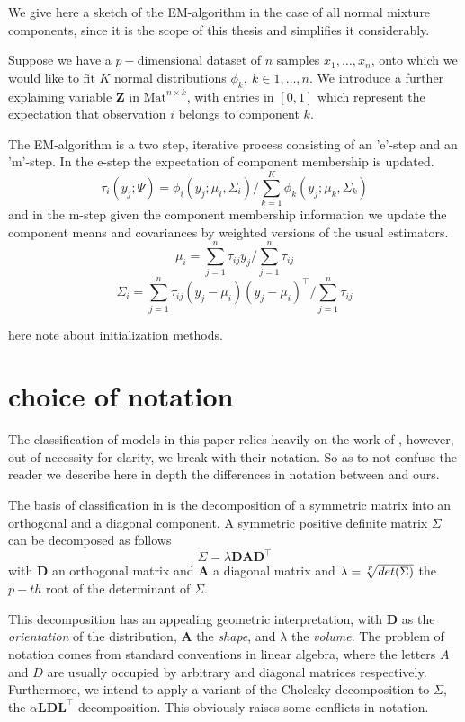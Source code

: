 We give here a sketch of the EM-algorithm in the case of all normal mixture 
components, since it is the scope of this thesis and simplifies it 
considerably.

Suppose we have a $p-$dimensional dataset of $n$ samples $x_1, \dots ,x_n$,
onto which we would like to fit $K$ normal distributions 
$\phi_k,\ k \in {1,\dots , n}$. 
We introduce a further explaining variable $\pmb{Z}$ in 
$\textrm{Mat}^{n\times k}$, with entries in $[0,1]$ which represent the 
expectation that observation $i$ belongs to component $k$.

The EM-algorithm is a two step, iterative process consisting of an 'e'-step
and an 'm'-step.
In the e-step the expectation of component membership is updated.
\[ \tau_i(y_j;\Psi) = \phi_i(y_j;\mu_i, \Sigma_i)/ \sum_{k=1}^K \phi_k(y_j;
    \mu_k, \Sigma_k)\]
and in the m-step given the component membership information we update the 
component means and covariances by weighted versions of the usual estimators.
\[\mu_i = \sum_{j=1}^n \tau_{ij}y_j / \sum_{j=1}^n \tau_{ij}\]
\[\Sigma_i = \sum_{j=1}^n \tau_{ij} (y_j- \mu_i)(y_j-\mu_i)^\top / 
    \sum_{j=1}^n \tau_{ij}\]

here note about initialization methods.



\section{choice of notation}

The classification of models in this paper relies heavily on the work of 
\cite{Cel95}, however, out of necessity for clarity, we break with their 
notation. 
So as to not confuse the reader we describe here in depth the differences in 
notation between \cite{Cel95} and ours.

The basis of classification in \cite{Cel95} is the decomposition of a
symmetric matrix into an orthogonal and a diagonal component.
A symmetric positive definite matrix $ \Sigma $ can be decomposed as follows
    \[ \Sigma = \lambda \pmb{D} \pmb{A} \pmb{D}^{\top} \]
with $ \pmb{D} $ an orthogonal matrix and $ \pmb{A} $ a diagonal matrix and
$ \lambda = \sqrt[\uproot{3}p]{det(\Sigma)} $ the $ p-th $ root of the 
determinant of $ \Sigma $.

This decomposition has an appealing geometric interpretation, with $ \pmb{D} $ 
as the \textit{orientation} of the distribution, $ \pmb{A} $ the \textit{shape},
and $ \lambda $ the \textit{volume}. The problem of notation comes from standard 
conventions in linear algebra, where the letters $A$ and $D$ are usually 
occupied by arbitrary and diagonal matrices respectively. Furthermore, we intend
to apply a variant of the Cholesky decomposition to $ \Sigma $, the 
$ \alpha\pmb{L}\pmb{D}\pmb{L}^{\top} $ decomposition. This obviously raises some
conflicts in notation.

